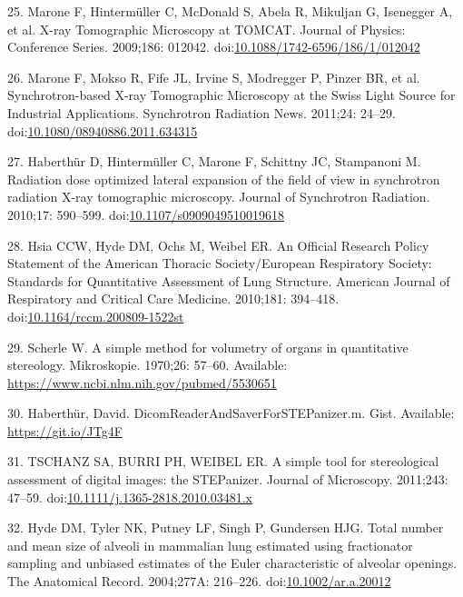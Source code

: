 \documentclass[
  american,
]{article}
\newenvironment{cslreferences}%
  {}%
  {\par}
\begin{document}
\begin{cslreferences}
\leavevmode\hypertarget{ref-knMAkPPz}{}%
25. Marone F, Hintermüller C, McDonald S, Abela R, Mikuljan G, Isenegger A, et al. X-ray Tomographic Microscopy at TOMCAT. Journal of Physics: Conference Series. 2009;186: 012042. doi:\href{https://doi.org/10.1088/1742-6596/186/1/012042}{10.1088/1742-6596/186/1/012042}

\leavevmode\hypertarget{ref-Cp0VRmEj}{}%
26. Marone F, Mokso R, Fife JL, Irvine S, Modregger P, Pinzer BR, et al. Synchrotron-based X-ray Tomographic Microscopy at the Swiss Light Source for Industrial Applications. Synchrotron Radiation News. 2011;24: 24--29. doi:\href{https://doi.org/10.1080/08940886.2011.634315}{10.1080/08940886.2011.634315}

\leavevmode\hypertarget{ref-VELl7OiR}{}%
27. Haberthür D, Hintermüller C, Marone F, Schittny JC, Stampanoni M. Radiation dose optimized lateral expansion of the field of view in synchrotron radiation X-ray tomographic microscopy. Journal of Synchrotron Radiation. 2010;17: 590--599. doi:\href{https://doi.org/10.1107/s0909049510019618}{10.1107/s0909049510019618}

\leavevmode\hypertarget{ref-dNc8FfNn}{}%
28. Hsia CCW, Hyde DM, Ochs M, Weibel ER. An Official Research Policy Statement of the American Thoracic Society/European Respiratory Society: Standards for Quantitative Assessment of Lung Structure. American Journal of Respiratory and Critical Care Medicine. 2010;181: 394--418. doi:\href{https://doi.org/10.1164/rccm.200809-1522st}{10.1164/rccm.200809-1522st}

\leavevmode\hypertarget{ref-KGbSQovR}{}%
29. Scherle W. A simple method for volumetry of organs in quantitative stereology. Mikroskopie. 1970;26: 57--60. Available: \url{https://www.ncbi.nlm.nih.gov/pubmed/5530651}

\leavevmode\hypertarget{ref-12Z2YPzm8}{}%
30. Haberthür, David. DicomReaderAndSaverForSTEPanizer.m. Gist. Available: \url{https://git.io/JTg4F}

\leavevmode\hypertarget{ref-nPoQ2EIB}{}%
31. TSCHANZ SA, BURRI PH, WEIBEL ER. A simple tool for stereological assessment of digital images: the STEPanizer. Journal of Microscopy. 2011;243: 47--59. doi:\href{https://doi.org/10.1111/j.1365-2818.2010.03481.x}{10.1111/j.1365-2818.2010.03481.x}

\leavevmode\hypertarget{ref-QiAxY2i3}{}%
32. Hyde DM, Tyler NK, Putney LF, Singh P, Gundersen HJG. Total number and mean size of alveoli in mammalian lung estimated using fractionator sampling and unbiased estimates of the Euler characteristic of alveolar openings. The Anatomical Record. 2004;277A: 216--226. doi:\href{https://doi.org/10.1002/ar.a.20012}{10.1002/ar.a.20012}


\end{cslreferences}
\end{document}
